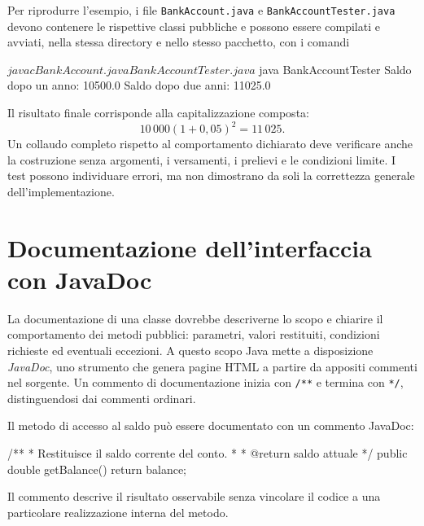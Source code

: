 

Per riprodurre l'esempio, i file \texttt{BankAccount.java}
e \texttt{BankAccountTester.java} devono contenere le
rispettive classi pubbliche e possono essere compilati
e avviati, nella stessa directory e nello stesso pacchetto,
con i comandi

\begin{unipdterminal}
$ javac BankAccount.java BankAccountTester.java
$ java BankAccountTester
Saldo dopo un anno: 10500.0
Saldo dopo due anni: 11025.0
\end{unipdterminal}

Il risultato finale corrisponde alla capitalizzazione composta:
\[
  10\,000(1+0{,}05)^2=11\,025.
\]
Un collaudo completo rispetto al comportamento dichiarato
deve verificare anche la costruzione senza argomenti, i
versamenti, i prelievi e le condizioni limite. I test
possono individuare errori, ma non dimostrano da soli la
correttezza generale dell'implementazione.

\clearpage

\section{Documentazione dell'interfaccia con JavaDoc}
\label{sec:fi-java-classi-javadoc}

La documentazione di una classe dovrebbe descriverne lo
scopo e chiarire il comportamento dei metodi pubblici:
parametri, valori restituiti, condizioni richieste ed
eventuali eccezioni. A questo scopo Java mette a
disposizione \emph{JavaDoc}, uno strumento che genera
pagine HTML a partire da appositi commenti nel sorgente.
Un commento di documentazione inizia con
\lstinline|/**| e termina con \lstinline|*/|,
distinguendosi dai commenti ordinari.

\begin{example}
Il metodo di accesso al saldo può essere documentato con
un commento JavaDoc:

\begin{unipdcode}[language=Java]
/**
 * Restituisce il saldo corrente del conto.
 *
 * @return saldo attuale
 */
public double getBalance() {
    return balance;
}
\end{unipdcode}
Il commento descrive il risultato osservabile senza
vincolare il codice a una particolare realizzazione
interna del metodo.
\end{example}

